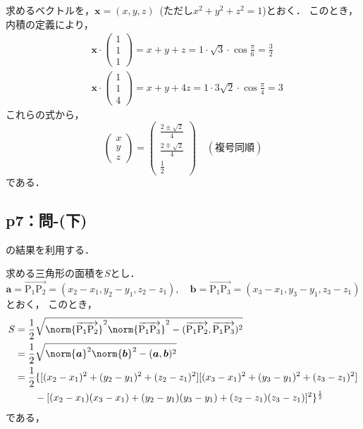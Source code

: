 \documentclass[uplatex,dvipdfmx,a4paper,10pt,fleqn]{jsarticle}
\begin{document}
\begin{tleftbar}
    求めるベクトルを，$\bm{x}=(x,y,z)$~(ただし$x^2+y^2 +z^2=1$)とおく．
    このとき，内積の定義により，
    \begin{align*}
        &\bm{x} \cdot 
        \begin{pmatrix}
                1 \\
                1 \\
                1
            \end{pmatrix}
        =x+y+z= 1 \cdot \sqrt{3} \cdot \cos \frac{\pi}{6} =\frac{3}{2} \\
        &\bm{x} \cdot 
            \begin{pmatrix}
                1 \\
                1 \\
                4
            \end{pmatrix}
        =x+y+4z= 1 \cdot 3\sqrt{2} \cdot \cos \frac{\pi}{4} =3
        \end{align*}
        これらの式から，
        \begin{equation*}
            \begin{pmatrix}
            x \\
            y \\
            z  
    \end{pmatrix}
    =
                \begin{pmatrix}
                \frac{2 \pm \sqrt{2}}{4} \\
                \frac{2 \mp \sqrt{2}}{4} \\
                \frac{1}{2} 
    \end{pmatrix}
            \quad (\text{複号同順})
    \end{equation*}
        である．
    \end{tleftbar}
    \subsection*{p7：問-(下)}
\begin{tleftbar}
	[1.4]の結果を利用する．

	求める三角形の面積を$S$とし．
    \[
    \bm{a}=\overrightarrow{\mathrm{P_1 P_2}}=(x_2-x_1,y_2-y_1,z_2-z_1),\quad \bm{b}=\overrightarrow{\mathrm{P_1 P_3}}=(x_3-x_1,y_3-y_1,z_3-z_1)
    \]
    とおく，
	このとき，
	\begin{align*}
		S & = \frac{1}{2} \sqrt{\norm{\overrightarrow{\mathrm{P_1 P_2}}}^2 \norm{\overrightarrow{\mathrm{P_1 P_3}}}^2 - (\overrightarrow{\mathrm{P_1 P_2}}, \overrightarrow{\mathrm{P_1 P_3}})^2} \\
		  & = \frac{1}{2} \sqrt{\norm{\bm{a}}^2 \norm{\bm{b}}^2 - (\bm{a},\bm{b})^2 } \\
		  & = \frac{1}{2} \{ \lbrack (x_2 - x_1)^2+(y_2-y_1)^2+ (z_2 - z_1)^2 \rbrack \lbrack (x_3 - x_1)^2+(y_3-y_1)^2+ (z_3 - z_1)^2 \rbrack\\
		  & \qquad - \lbrack (x_2-x_1)(x_3-x_1)+(y_2 -y_1)(y_3-y_1)+(z_2-z_1)(z_3-z_1)\rbrack ^2\}^{\frac{1}{2}}
	\end{align*}
	である，
\end{tleftbar}
	
\end{document}
